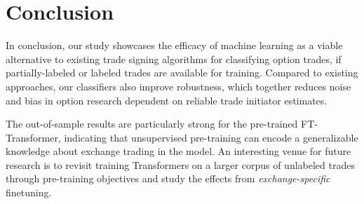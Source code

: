 \section{Conclusion}

In conclusion, our study showcases the efficacy of machine learning as a viable alternative to existing trade signing algorithms for classifying option trades, if partially-labeled or labeled trades are available for training. Compared to existing approaches, our classifiers also improve robustness, which together reduces noise and bias in option research dependent on reliable trade initiator estimates.

The out-of-sample results are particularly strong for the pre-trained FT-Transformer, indicating that unsupervised pre-training can encode a generalizable knowledge about exchange trading in the model. An interesting venue for future research is to revisit training Transformers on a larger corpus of unlabeled trades through pre-training objectives and study the effects from \textit{exchange-specific} finetuning.

